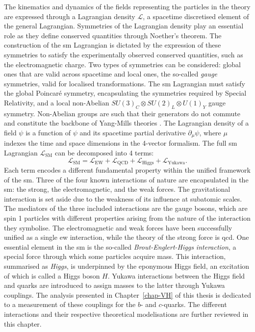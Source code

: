 The kinematics and dynamics of the fields representing the particles in the theory are expressed through a Lagrangian density $\mathcal{L}$, a spacetime discretised element of the general Lagrangian. Symmetries of the Lagrangian density play an essential role as they define conserved quantities through Noether's theorem. The construction of the \gls{sm} Lagrangian is dictated by the expression of these symmetries to satisfy the experimentally observed conserved quantities, such as the electromagnetic charge. Two types of symmetries can be considered: global ones that are valid across spacetime and local ones, the so-called \textit{gauge} symmetries, valid for localised transformations. The \gls{sm} Lagrangian must satisfy the global Poincaré symmetry, encapsulating the symmetries required by Special Relativity, and a local non-Abelian $SU(3)_C \otimes SU(2)_L \otimes U(1)_Y$ gauge symmetry. Non-Abelian groups are such that their generators do not commute and constitute the backbone of Yang-Mills theories \cite{PhysRev.96.191}. The Lagrangian density of a field $\psi$ is a function of $\psi$ and its spacetime partial derivative $\partial_{\mu} \psi$, where $\mu$ indexes the time and space dimensions in the 4-vector formalism. The full \gls{sm} Lagrangian $\mathcal{L}_{\text{SM}}$ can be decomposed into 4 terms:
\begin{equation}\label{eq-SMGlobal}
    \mathcal{L}_{\text{SM}} = \mathcal{L}_{\text{EW}} + \mathcal{L}_{\text{QCD}} + \mathcal{L}_{\text{Higgs}} + \mathcal{L}_{\text{Yukawa}}.
\end{equation}
Each term encodes a different fundamental property within the unified framework of the \gls{sm}. Three of the four known interactions of nature are encapsulated in the \gls{sm}: the strong, the electromagnetic, and the weak forces. The gravitational interaction is set aside due to the weakness of its influence at subatomic scales. The mediators of the three included interactions are the gauge bosons, which are spin 1 particles with different properties arising from the nature of the interaction they symbolise. The electromagnetic and weak forces have been successfully unified as a single \gls{ew} interaction, while the theory of the strong force is \gls{qcd}. One essential element in the \gls{sm} is the so-called \textit{Brout-Englert-Higgs interaction}, a special force through which some particles acquire mass. This interaction, summarised as \textit{Higgs}, is underpinned by the eponymous Higgs field, an excitation of which is called a Higgs boson $H$. Yukawa interactions between the Higgs field and quarks are introduced to assign masses to the latter through Yukawa couplings. The analysis presented in Chapter~\ref{chap-VH} of this thesis is dedicated to a measurement of these couplings for the $b$- and $c$-quarks. The different interactions and their respective theoretical modelisations are further reviewed in this chapter.

